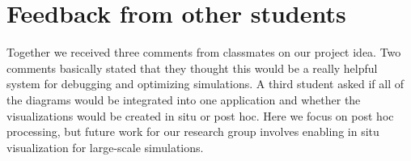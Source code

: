 \documentclass{acm_proc_article-sp}
\begin{document}
\section{Feedback from other students}
Together we received three comments from classmates on our project idea.  Two comments basically stated that they thought this would be a really helpful system for debugging and optimizing simulations.  A third student asked if all of the diagrams would be integrated into one application and whether the visualizations would be created in situ or post hoc.  Here we focus on post hoc processing, but future work for our research group involves enabling in situ visualization for large-scale simulations.  







%

%
%


\end{document}
